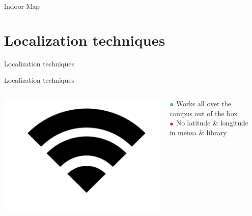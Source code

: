 \documentclass[11pt]{beamer}
\begin{document}
\begin{frame}{Indoor Map}
\end{frame}

\section{Localization techniques}

\begin{frame}{}

  \begin{center}

    {\Huge Localization techniques}

  \end{center}

\end{frame}


\begin{frame}{Localization techniques}

  \begin{columns}

    \begin{column}{0.2\textwidth}
      \includegraphics[width=\textwidth]{wifi-symbol}
    \end{column}

    \hfill

    \begin{column}{0.8\textwidth}

      \includegraphics[width=0.05\textwidth]{plus} Works all over the campus out of the box\\
      \includegraphics[width=0.05\textwidth]{minus} No latitude \& longitude in mensa \& library


\end{column}
\end{columns}
\end{frame}
\end{document}
